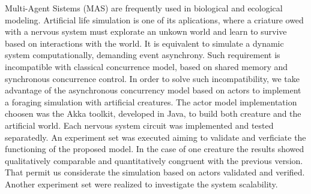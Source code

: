 


\begin{resumo}[Abstract]
Multi-Agent Sistems (MAS) are frequently  used in biological and ecological modeling. 
Artificial life simulation is one of its aplications, where a criature owed with a nervous system must explorate an unkown world and learn to survive based on interactions with the world.
It is equivalent to simulate a dynamic system computationally, demanding event asynchrony. 
Such requirement is incompatible with classical concurrence model, based on shared memory and synchronous concurrence control.
In order to solve such incompatibility, we take advantage of the asynchronous concurrency model based on actors to implement a foraging simulation with artificial creatures.
The actor model implementation choosen was the Akka toolkit, developed in Java, to build both creature and the artificial world.
Each nervous system circuit was implemented and tested separatedly.
An experiment set was executed aiming to validate and verficiate the functioning of the proposed model.
In the case of one creature the results showed qualitatively comparable and quantitatively congruent with the previous version.
That permit us considerate the simulation based on actors validated and verified. Another experiment set were realized to investigate the system scalability.


\end{resumo}
